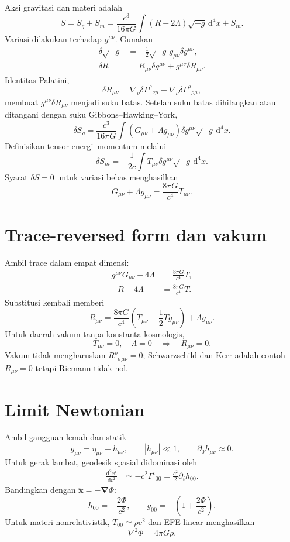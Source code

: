 \documentclass[12pt,a4paper]{report}
\newcommand{\dd}{\mathrm{d}}
\newcommand{\pd}{\partial}
\begin{document}
Aksi gravitasi dan materi adalah
\[
 S=S_g+S_m
 =\frac{c^3}{16\pi G}\int(R-2\Lambda)\sqrt{-g}\,\dd^4x+S_m.
\]
Variasi dilakukan terhadap $g^{\mu\nu}$. Gunakan
\begin{align}
 \delta\sqrt{-g}&=-\frac12\sqrt{-g}\,g_{\mu\nu}\delta g^{\mu\nu},\\
 \delta R&=R_{\mu\nu}\delta g^{\mu\nu}
 +g^{\mu\nu}\delta R_{\mu\nu}.
\end{align}
Identitas Palatini,
\[
 \delta R_{\mu\nu}
 =\nabla_\rho\delta\Gamma^\rho{}_{\nu\mu}
 -\nabla_\nu\delta\Gamma^\rho{}_{\rho\mu},
\]
membuat $g^{\mu\nu}\delta R_{\mu\nu}$ menjadi suku batas. Setelah suku batas
dihilangkan atau ditangani dengan suku Gibbons--Hawking--York,
\[
 \delta S_g
 =\frac{c^3}{16\pi G}\int
 (G_{\mu\nu}+\Lambda g_{\mu\nu})
 \delta g^{\mu\nu}\sqrt{-g}\,\dd^4x.
\]
Definisikan tensor energi--momentum melalui
\[
 \delta S_m=-\frac{1}{2c}\int T_{\mu\nu}\delta g^{\mu\nu}
 \sqrt{-g}\,\dd^4x.
\]
Syarat $\delta S=0$ untuk variasi bebas menghasilkan
\[
 \boxed{
 G_{\mu\nu}+\Lambda g_{\mu\nu}
 =\frac{8\pi G}{c^4}T_{\mu\nu}}.
\]

\section{Trace-reversed form dan vakum}

Ambil trace dalam empat dimensi:
\begin{align}
 g^{\mu\nu}G_{\mu\nu}+4\Lambda
 &=\frac{8\pi G}{c^4}T,\\
 -R+4\Lambda&=\frac{8\pi G}{c^4}T.
\end{align}
Substitusi kembali memberi
\[
 R_{\mu\nu}
 =\frac{8\pi G}{c^4}\left(T_{\mu\nu}-\frac12Tg_{\mu\nu}\right)
 +\Lambda g_{\mu\nu}.
\]
Untuk daerah vakum tanpa konstanta kosmologis,
\[
 T_{\mu\nu}=0,\quad\Lambda=0
 \quad\Longrightarrow\quad
 \boxed{R_{\mu\nu}=0}.
\]
Vakum tidak mengharuskan $R^\rho{}_{\sigma\mu\nu}=0$; Schwarzschild dan Kerr
adalah contoh $R_{\mu\nu}=0$ tetapi Riemann tidak nol.

\section{Limit Newtonian}

Ambil gangguan lemah dan statik
\[
 g_{\mu\nu}=\eta_{\mu\nu}+h_{\mu\nu},
 \qquad |h_{\mu\nu}|\ll1,
 \qquad \pd_0h_{\mu\nu}\approx0.
\]
Untuk gerak lambat, geodesik spasial didominasi oleh
\begin{align}
 \frac{\dd^2x^i}{\dd t^2}
 &\simeq-c^2\Gamma^i{}_{00}
 =\frac{c^2}{2}\pd_i h_{00}.
\end{align}
Bandingkan dengan $\ddot{\bm x}=-\bm\nabla\Phi$:
\[
 \boxed{h_{00}=-\frac{2\Phi}{c^2}},
 \qquad
 g_{00}=-\left(1+\frac{2\Phi}{c^2}\right).
\]
Untuk materi nonrelativistik, $T_{00}\simeq\rho c^2$ dan EFE linear menghasilkan
\[
 \nabla^2\Phi=4\pi G\rho.
\]
\end{document}
